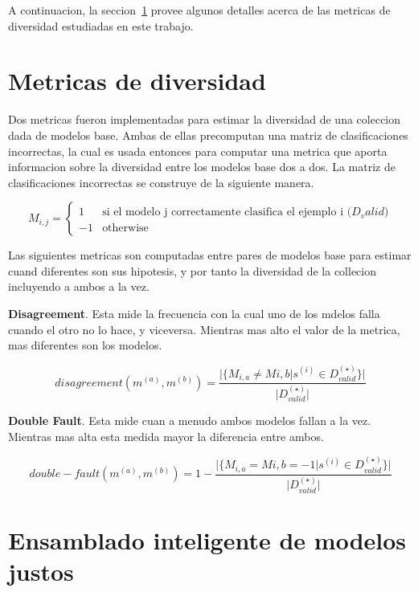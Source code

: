 A continuacion, la seccion~\ref{section:diversity-meassures} provee algunos detalles acerca de las metricas de diversidad estudiadas en este trabajo.

\section{Metricas de diversidad}\label{section:diversity-meassures}

Dos metricas fueron implementadas para estimar la diversidad de una coleccion dada de modelos base. Ambas de ellas precomputan una matriz de clasificaciones incorrectas, la cual es usada entonces para computar una metrica que aporta informacion sobre la diversidad entre los modelos base dos a dos. La matriz de clasificaciones incorrectas se construye de la siguiente manera.

\begin{equation}
    M_{i,j} =
    \begin{cases}
        1 & \text{si el modelo j correctamente clasifica el ejemplo i ($D_valid$)} \\
        -1 & \text{otherwise}
    \end{cases}
\end{equation}

Las siguientes metricas son computadas entre pares de modelos base para estimar cuand diferentes son sus hipotesis, y por tanto la diversidad de la collecion incluyendo a ambos a la vez.

\textbf{Disagreement}. Esta mide la frecuencia con la cual uno de los mdelos falla cuando el otro no lo hace, y viceversa. Mientras mas alto el valor de la metrica, mas diferentes son los modelos.

\begin{equation}
    disagreement(m^{(a)}, m^{(b)}) = \frac{\vert\{M_{i,a} \neq M{i,b} \vert s^{(i)} \in D^{(\star)}_{valid}\}\vert}{\vert D^{(\star)}_{valid} \vert}
\end{equation}

\textbf{Double Fault}. Esta mide cuan a menudo ambos modelos fallan a la vez. Mientras mas alta esta medida mayor la diferencia entre ambos.

\begin{equation}
    double-fault(m^{(a)}, m^{(b)}) = 1 - \frac{\vert\{M_{i,a} = M{i,b} = -1 \vert s^{(i)} \in D^{(\star)}_{valid}\}\vert}{\vert D^{(\star)}_{valid} \vert}
\end{equation}

\section{Ensamblado inteligente de modelos justos}\label{section:second-phase}

